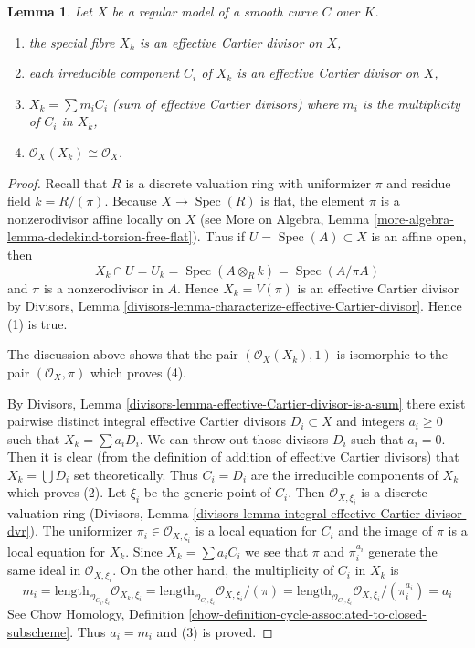 \documentclass[10pt,a4paper]{amsart}
\theoremstyle{plain}
\newtheorem{lemma}[subsection]{Lemma}
\theoremstyle{definition}
\theoremstyle{remark}
\numberwithin{equation}{subsection}
\def\Spec{\mathop{\mathrm{Spec}}}
\begin{document}
\begin{lemma}
\label{lemma-divisor-special-fiber}
Let $X$ be a regular model of a smooth curve $C$ over $K$.
\begin{enumerate}
\item the special fibre $X_k$ is an effective Cartier divisor on $X$,
\item each irreducible component $C_i$ of $X_k$ is an effective
Cartier divisor on $X$,
\item $X_k = \sum m_i C_i$ (sum of effective Cartier divisors)
where $m_i$ is the multiplicity of $C_i$ in $X_k$,
\item $\mathcal{O}_X(X_k) \cong \mathcal{O}_X$.
\end{enumerate}
\end{lemma}

\begin{proof}
Recall that $R$ is a discrete valuation ring with uniformizer $\pi$
and residue field $k = R/(\pi)$. Because $X \to \Spec(R)$ is flat,
the element $\pi$ is a nonzerodivisor affine locally on $X$
(see More on Algebra, Lemma
\ref{more-algebra-lemma-dedekind-torsion-free-flat}). Thus
if $U = \Spec(A) \subset X$ is an affine open, then
$$
X_k \cap U = U_k = \Spec(A \otimes_R k) = \Spec(A/\pi A)
$$
and $\pi$ is a nonzerodivisor in $A$.
Hence $X_k = V(\pi)$ is an effective Cartier divisor by
Divisors, Lemma \ref{divisors-lemma-characterize-effective-Cartier-divisor}.
Hence (1) is true.

\medskip\noindent
The discussion above shows that the pair $(\mathcal{O}_X(X_k), 1)$
is isomorphic to the pair $(\mathcal{O}_X, \pi)$ which proves (4).

\medskip\noindent
By Divisors, Lemma \ref{divisors-lemma-effective-Cartier-divisor-is-a-sum}
there exist pairwise distinct integral effective Cartier divisors
$D_i \subset X$ and integers $a_i \geq 0$ such that $X_k = \sum a_i D_i$.
We can throw out those divisors $D_i$ such that $a_i = 0$. Then it is
clear (from the definition of addition of effective Cartier
divisors) that $X_k = \bigcup D_i$ set theoretically. Thus $C_i = D_i$
are the irreducible components of $X_k$ which proves (2).
Let $\xi_i$ be the generic point of $C_i$.
Then $\mathcal{O}_{X, \xi_i}$ is a discrete valuation ring
(Divisors, Lemma \ref{divisors-lemma-integral-effective-Cartier-divisor-dvr}).
The uniformizer $\pi_i \in \mathcal{O}_{X, \xi_i}$ is a local equation
for $C_i$ and the image of $\pi$ is a local equation for $X_k$.
Since $X_k = \sum a_i C_i$ we see that $\pi$ and $\pi_i^{a_i}$
generate the same ideal in $\mathcal{O}_{X, \xi_i}$.
On the other hand, the multiplicity of $C_i$ in $X_k$ is
$$
m_i = \text{length}_{\mathcal{O}_{C_i, \xi_i}} \mathcal{O}_{X_k, \xi_i} =
\text{length}_{\mathcal{O}_{C_i, \xi_i}} \mathcal{O}_{X, \xi_i}/(\pi) =
\text{length}_{\mathcal{O}_{C_i, \xi_i}} \mathcal{O}_{X, \xi_i}/(\pi_i^{a_i}) =
a_i
$$
See Chow Homology, Definition
\ref{chow-definition-cycle-associated-to-closed-subscheme}.
Thus $a_i = m_i$ and (3) is proved.
\end{proof}
\end{document}

